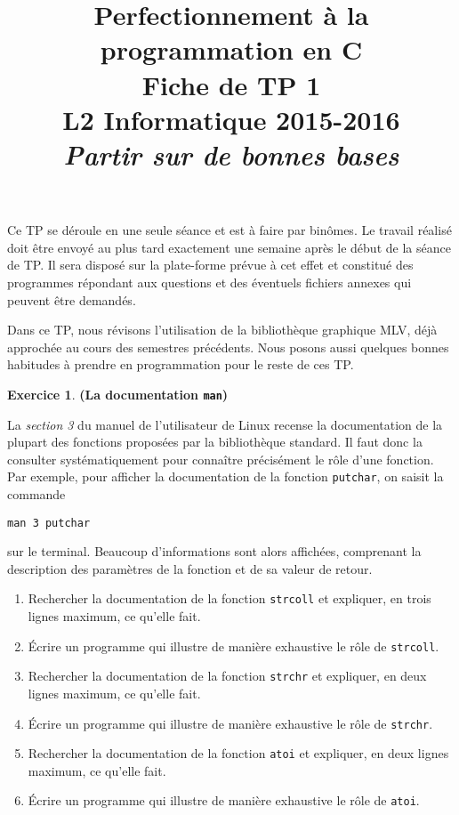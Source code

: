 \documentclass[12pt]{article}
\date{}
\title{{\bf Perfectionnement à la programmation en {\sf C}} \\
    Fiche de TP 1 \\
    {\small L2 Informatique 2015-2016} \\
    {\it \small Partir sur de bonnes bases}}
\theoremstyle{definition}
\newtheorem{Exercice}{Exercice}
\begin{document}
\maketitle

Ce TP se déroule en une seule séance et est à faire par binômes.
Le travail réalisé doit être envoyé au plus tard exactement une
semaine après le début de la séance de TP. Il sera disposé sur
la plate-forme prévue à cet effet et constitué des programmes
répondant aux questions et des éventuels fichiers annexes qui
peuvent être demandés.
\bigskip

Dans ce TP, nous révisons l'utilisation de la bibliothèque graphique
{\sf MLV}, déjà approchée au cours des semestres précédents. Nous posons 
aussi quelques bonnes habitudes à prendre en programmation pour le reste 
de ces TP.
\bigskip
\bigskip

\begin{Exercice} {\bf (La documentation {\tt man})}\smallskip

La {\em section 3} du manuel de l'utilisateur de {\sf Linux} recense
la documentation de la plupart des fonctions proposées par la 
bibliothèque standard. Il faut donc la consulter systématiquement pour 
connaître précisément le rôle d'une fonction. Par exemple, pour afficher
la documentation de la fonction {\tt putchar}, on saisit la commande
\begin{center}
    {\tt man 3 putchar}
\end{center}
sur le terminal. Beaucoup d'informations sont alors affichées,
comprenant la description des paramètres de la fonction et de sa
valeur de retour.

\begin{enumerate}
    \item Rechercher la documentation de la fonction {\tt strcoll} et
    expliquer, en trois lignes maximum, ce qu'elle fait.
    \smallskip

    \item Écrire un programme qui illustre de manière exhaustive
    le rôle de {\tt strcoll}.
    \smallskip

    \item Rechercher la documentation de la fonction {\tt strchr} et
    expliquer, en deux lignes maximum, ce qu'elle fait.
    \smallskip

    \item Écrire un programme qui illustre de manière exhaustive
    le rôle de {\tt strchr}.
    \smallskip

    \item Rechercher la documentation de la fonction {\tt atoi} et
    expliquer, en deux lignes maximum, ce qu'elle fait.
    \smallskip

    \item Écrire un programme qui illustre de manière exhaustive
    le rôle de {\tt atoi}.
\end{enumerate}
\end{Exercice}
\bigskip
\end{document}
